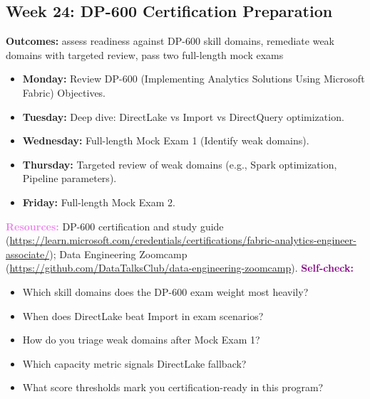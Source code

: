 \documentclass[11pt, a4paper]{article}
\newcommand{\dayitem}[2]{\item \textbf{#1:} #2}
\newcommand{\resources}[1]{\vspace{1mm}\noindent\textbf{\textcolor{violet}{Resources:}} #1}
\newcommand{\selfcheck}[1]{\vspace{1mm}\noindent\textbf{\textcolor{purple}{Self-check:}} #1}
\begin{document}
\subsection*{Week 24: DP-600 Certification Preparation}
\par\noindent\textbf{Outcomes:} assess readiness against DP-600 skill domains, remediate weak domains with targeted review, pass two full-length mock exams
\begin{itemize}[label=-]
    \dayitem{Monday}{Review DP-600 (Implementing Analytics Solutions Using Microsoft Fabric) Objectives.}
    \dayitem{Tuesday}{Deep dive: DirectLake vs Import vs DirectQuery optimization.}
    \dayitem{Wednesday}{Full-length Mock Exam 1 (Identify weak domains).}
    \dayitem{Thursday}{Targeted review of weak domains (e.g., Spark optimization, Pipeline parameters).}
    \dayitem{Friday}{Full-length Mock Exam 2.}
\end{itemize}
\resources{DP-600 certification and study guide (\url{https://learn.microsoft.com/credentials/certifications/fabric-analytics-engineer-associate/}); Data Engineering Zoomcamp (\url{https://github.com/DataTalksClub/data-engineering-zoomcamp}).}
\selfcheck{
\begin{itemize}[label=$\bullet$, leftmargin=6mm, itemsep=0pt]
    \item Which skill domains does the DP-600 exam weight most heavily?
    \item When does DirectLake beat Import in exam scenarios?
    \item How do you triage weak domains after Mock Exam 1?
    \item Which capacity metric signals DirectLake fallback?
    \item What score thresholds mark you certification-ready in this program?
\end{itemize}
}
\end{document}

